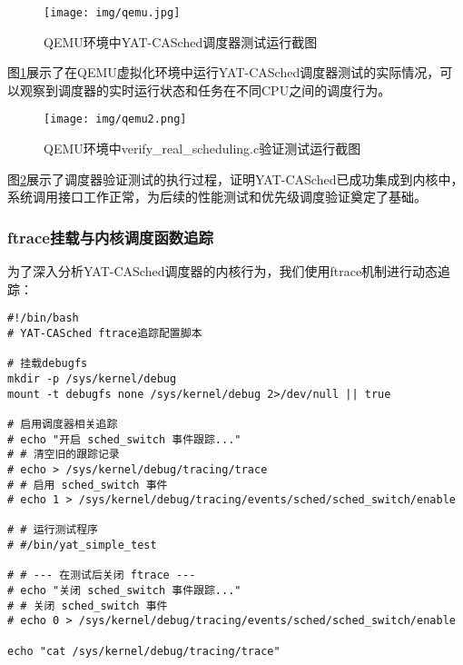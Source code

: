 \begin{figure}[H]
\centering
\texttt{[image: img/qemu.jpg]}
\caption{QEMU环境中YAT-CASched调度器测试运行截图}
\label{fig:qemu-running}
\end{figure}

图\ref{fig:qemu-running}展示了在QEMU虚拟化环境中运行YAT-CASched调度器测试的实际情况，可以观察到调度器的实时运行状态和任务在不同CPU之间的调度行为。

\begin{figure}[H]
\centering
\texttt{[image: img/qemu2.png]}
\caption{QEMU环境中verify\_real\_scheduling.c验证测试运行截图}
\label{fig:qemu-running2}
\end{figure}

图\ref{fig:qemu-running2}展示了调度器验证测试的执行过程，证明YAT-CASched已成功集成到内核中，系统调用接口工作正常，为后续的性能测试和优先级调度验证奠定了基础。

\subsubsection{ftrace挂载与内核调度函数追踪}
为了深入分析YAT-CASched调度器的内核行为，我们使用ftrace机制进行动态追踪：

\begin{tcolorbox} [
    enhanced,
    colback=cyan!5,
    colframe=cyan!40!black,
    leftrule=3mm,
    rightrule=0mm,
    toprule=0mm,
    bottomrule=0mm,
    arc=2mm,
    left=5mm,
    right=5mm,
    top=3mm,
    bottom=3mm,
    fonttitle=\bfseries,
    title=\textbf{ftrace追踪脚本}
]
\begin{lstlisting}[basicstyle=\footnotesize\fontfamily{zi4}\selectfont, showstringspaces=false]
#!/bin/bash
# YAT-CASched ftrace追踪配置脚本

# 挂载debugfs
mkdir -p /sys/kernel/debug
mount -t debugfs none /sys/kernel/debug 2>/dev/null || true

# 启用调度器相关追踪
# echo "开启 sched_switch 事件跟踪..."
# # 清空旧的跟踪记录
# echo > /sys/kernel/debug/tracing/trace
# # 启用 sched_switch 事件
# echo 1 > /sys/kernel/debug/tracing/events/sched/sched_switch/enable

# # 运行测试程序
# #/bin/yat_simple_test

# # --- 在测试后关闭 ftrace ---
# echo "关闭 sched_switch 事件跟踪..."
# # 关闭 sched_switch 事件
# echo 0 > /sys/kernel/debug/tracing/events/sched/sched_switch/enable

echo "cat /sys/kernel/debug/tracing/trace"
\end{lstlisting}
\end{tcolorbox}

